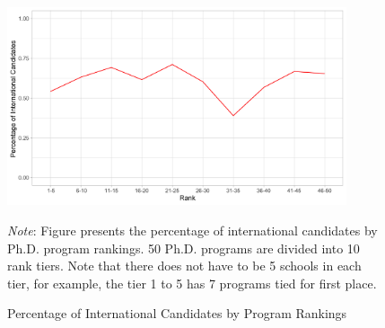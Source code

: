 \begin{figure}[H]
    \begin{center}
    \caption{Percentage of International Candidates by Program Rankings}
    \includegraphics[width=100mm, scale=0.5]{fig/figure2.png}
    \end{center}
	\label{fig:figure1}
    \vspace{0.3cm}
    \begin{minipage}{0.95\textwidth} 
	{\footnotesize \textit{Note}: Figure presents the percentage of international candidates by Ph.D. program rankings. 50 Ph.D. programs are divided into 10 rank tiers. Note that there does not have to be 5 schools in each tier, for example, the tier 1 to 5 has 7 programs tied for first place.
	\par
	}
	\end{minipage}
\end{figure}
